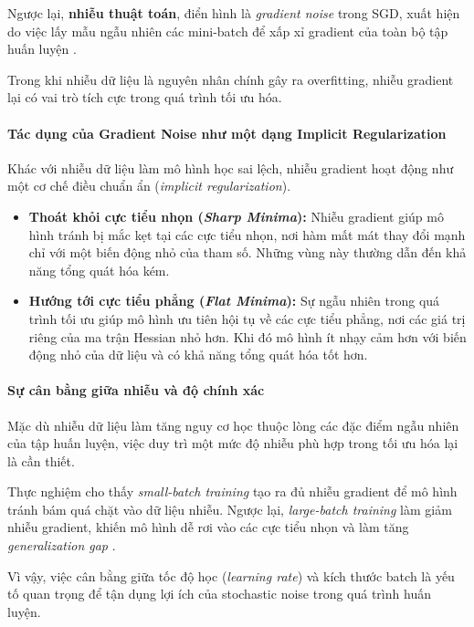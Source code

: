 Ngược lại, \textbf{nhiễu thuật toán}, điển hình là \textit{gradient noise} trong SGD, xuất hiện do việc lấy mẫu ngẫu nhiên các mini-batch để xấp xỉ gradient của toàn bộ tập huấn luyện \cite{keskar2017largebatchtrainingdeeplearning}.

Trong khi nhiễu dữ liệu là nguyên nhân chính gây ra overfitting, nhiễu gradient lại có vai trò tích cực trong quá trình tối ưu hóa.

\paragraph{Tác dụng của Gradient Noise như một dạng Implicit Regularization}

Khác với nhiễu dữ liệu làm mô hình học sai lệch, nhiễu gradient hoạt động như một cơ chế điều chuẩn ẩn (\textit{implicit regularization})\cite{pmlr-v119-wu20c}.

\begin{itemize}
    \item \textbf{Thoát khỏi cực tiểu nhọn (\textit{Sharp Minima}):} Nhiễu gradient giúp mô hình tránh bị mắc kẹt tại các cực tiểu nhọn, nơi hàm mất mát thay đổi mạnh chỉ với một biến động nhỏ của tham số. Những vùng này thường dẫn đến khả năng tổng quát hóa kém.

    \item \textbf{Hướng tới cực tiểu phẳng (\textit{Flat Minima}):} Sự ngẫu nhiên trong quá trình tối ưu giúp mô hình ưu tiên hội tụ về các cực tiểu phẳng, nơi các giá trị riêng của ma trận Hessian nhỏ hơn. Khi đó mô hình ít nhạy cảm hơn với biến động nhỏ của dữ liệu và có khả năng tổng quát hóa tốt hơn.
\end{itemize}

\paragraph{Sự cân bằng giữa nhiễu và độ chính xác}

Mặc dù nhiễu dữ liệu làm tăng nguy cơ học thuộc lòng các đặc điểm ngẫu nhiên của tập huấn luyện, việc duy trì một mức độ nhiễu phù hợp trong tối ưu hóa lại là cần thiết.

Thực nghiệm cho thấy \textit{small-batch training} tạo ra đủ nhiễu gradient để mô hình tránh bám quá chặt vào dữ liệu nhiễu. Ngược lại, \textit{large-batch training} làm giảm nhiễu gradient, khiến mô hình dễ rơi vào các cực tiểu nhọn và làm tăng \textit{generalization gap} \cite{keskar2017largebatchtrainingdeeplearning}.

Vì vậy, việc cân bằng giữa tốc độ học (\textit{learning rate}) và kích thước batch là yếu tố quan trọng để tận dụng lợi ích của stochastic noise trong quá trình huấn luyện.
